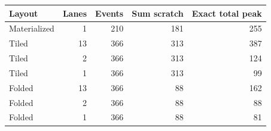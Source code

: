 \begin{tabular}{lrrrr}
\toprule
Layout & Lanes & Events & Sum scratch & Exact total peak\\
\midrule
Materialized & 1 & 210 & 181 & 255\\
Tiled & 13 & 366 & 313 & 387\\
Tiled & 2 & 366 & 313 & 124\\
Tiled & 1 & 366 & 313 & 99\\
Folded & 13 & 366 & 88 & 162\\
Folded & 2 & 366 & 88 & 88\\
Folded & 1 & 366 & 88 & 81\\
\bottomrule
\end{tabular}
